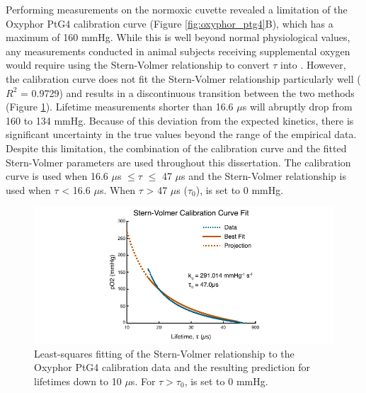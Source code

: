 Performing measurements on the normoxic cuvette revealed a limitation of the Oxyphor PtG4 calibration curve (Figure \ref{fig:oxyphor_ptg4}B), which has a maximum  of 160 mmHg. While this is well beyond normal physiological values, any measurements conducted in animal subjects receiving supplemental oxygen would require using the Stern-Volmer relationship to convert $\tau$ into . However, the calibration curve does not fit the Stern-Volmer relationship particularly well ($R^2$ = 0.9729) and results in a discontinuous transition between the two methods (Figure \ref{fig:sternvolmerfit}). Lifetime measurements shorter than 16.6 $\mu$s will abruptly drop from 160 to 134 mmHg. Because of this deviation from the expected kinetics, there is significant uncertainty in the true  values beyond the range of the empirical data. Despite this limitation, the combination of the calibration curve and the fitted Stern-Volmer parameters are used throughout this dissertation. The calibration curve is used when 16.6 $\mu$s $\le \tau$ $\le$ 47 $\mu$s and the Stern-Volmer relationship is used when $\tau$ \textless{} 16.6 $\mu$s. When $\tau$ \textgreater{} 47 $\mu$s ($\tau_0$),  is set to 0 mmHg.

\begin{figure}
    \includegraphics{figures/chapter_2/sternvolmerfit.pdf}
    \caption{
        \label{fig:sternvolmerfit}
        Least-squares fitting of the Stern-Volmer relationship to the Oxyphor PtG4 calibration data and the resulting prediction for lifetimes down to 10 $\mu$s. For $\tau > \tau_0$,  is set to 0 mmHg.
    }
\end{figure}



